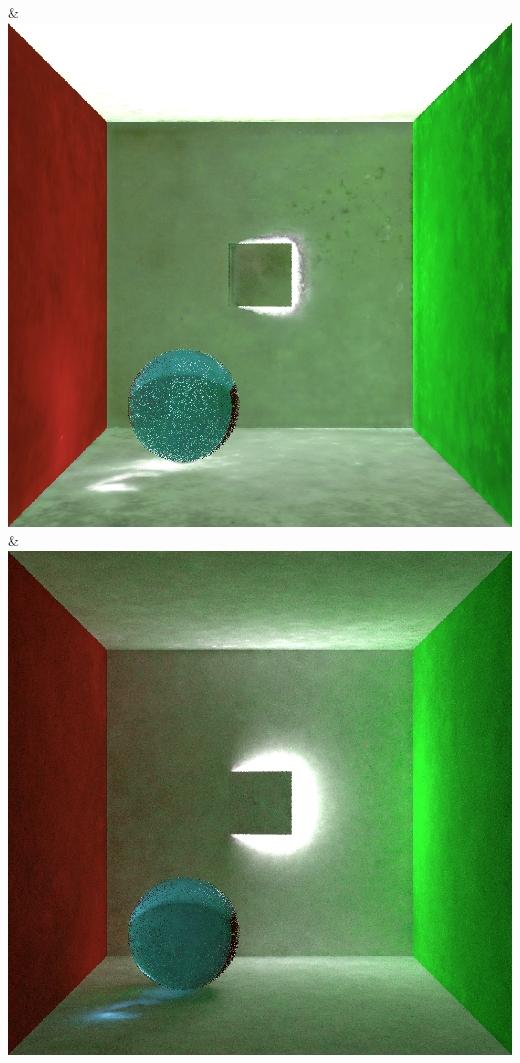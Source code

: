 & \includegraphics[width=\linewidth]{figures/py/tests/quality_comparison/nrc+lt+bal_1spp_ajar_caustic.png}
& \includegraphics[width=\linewidth]{figures/py/tests/quality_comparison/nrc+sppc_1spp_ajar_caustic.png}
